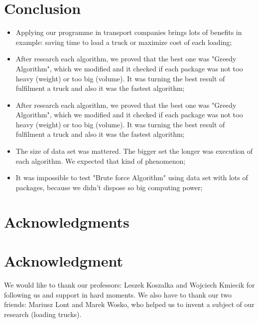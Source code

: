 \documentclass[conference,compsoc]{IEEEtran}
\begin{document}
\section{Conclusion}
\begin{itemize}
\item Applying our programme in transport companies brings lots of benefits in example: saving time to load a truck or maximize cost of each loading;

\item After research each algorithm, we proved that the best one was "Greedy Algorithm", which we modified and it checked if each package was not too heavy (weight) or too big (volume). It was turning the best result of fulfilment a truck and also it was the fastest algorithm;

\item After research each algorithm, we proved that the best one was "Greedy Algorithm", which we modified and it checked if each package was not too heavy (weight) or too big (volume). It was turning the best result of fulfilment a truck and also it was the fastest algorithm;

\item The size of data set was mattered. The bigger set the longer was execution of each algorithm. We expected that kind of phenomenon;

\item It was impossible to test "Brute force Algorithm" using data set with lots of packages, because we didn't dispose so big computing power;

\end{itemize}




\ifCLASSOPTIONcompsoc
  \section*{Acknowledgments}
\else
  \section*{Acknowledgment}
\fi

We would like to thank our professors: Leszek Koszalka and Wojciech Kmiecik for following us and support in hard moments. We also have to thank our two friends: Mariusz Lont and Marek Wosko, who helped us to invent a subject of our research (loading trucks). 
\end{document}
